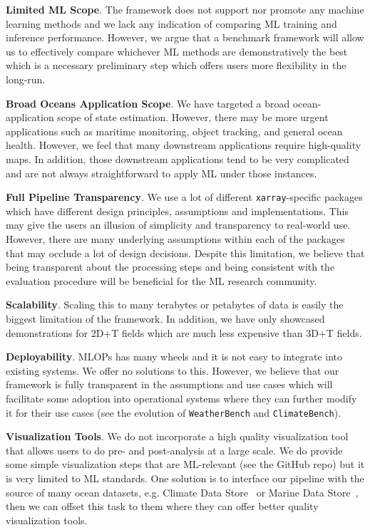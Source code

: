 \textbf{Limited ML Scope}. 
The framework does not support nor promote any machine learning methods and we lack any indication of comparing ML training and inference performance. 
However, we argue that a benchmark framework will allow us to effectively compare whichever ML methods are demonstratively the best which is a necessary preliminary step which offers users more flexibility in the long-run.

\textbf{Broad Oceans Application Scope}. 
We have targeted a broad ocean-application scope of state estimation.
However, there may be more urgent applications such as maritime monitoring, object tracking, and general ocean health.
However, we feel that many downstream applications require high-quality maps.
In addition, those downstream applications tend to be very complicated and are not always straightforward to apply ML under those instances.

\textbf{Full Pipeline Transparency}. We use a lot of different \texttt{xarray}-specific packages which have different design principles, assumptions and implementations. This may give the users an illusion of simplicity and transparency to real-world use. However, there are many underlying assumptions within each of the packages that may occlude a lot of design decisions.
Despite this limitation, we believe that being transparent about the processing steps and being consistent with the evaluation procedure will be beneficial for the ML research community.

\textbf{Scalability}. Scaling this to many terabytes or petabytes of data is easily the biggest limitation of the framework. In addition, we have only showcased demonstrations for 2D+T fields which are much less expensive than 3D+T fields.

\textbf{Deployability}. MLOPs has many wheels and it is not easy to integrate into existing systems. We offer no solutions to this. 
However, we believe that our framework is fully transparent in the assumptions and use cases which will facilitate some adoption into operational systems where they can further modify it for their use cases (see the evolution of \texttt{WeatherBench} and \texttt{ClimateBench}).

\textbf{Visualization Tools}.
We do not incorporate a high quality visualization tool that allows users to do pre- and post-analysis at a large scale. 
We do provide some simple visualization steps that are ML-relevant (see the GitHub repo) but it is very limited to ML standards.
One solution is to interface our pipeline with the source of many ocean datasets, e.g. Climate Data Store~\citep{CDSREANALYSISSST} or Marine Data Store~\citep{MDSOCEANPHYSICS}, then we can offset this task to them where they can offer better quality visualization tools.

